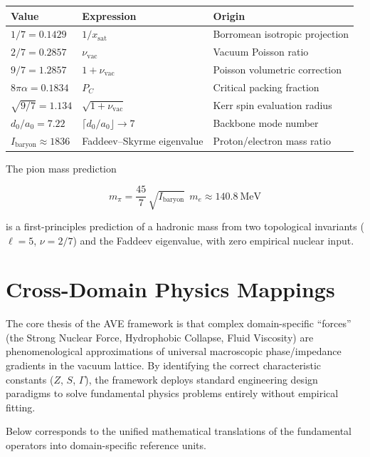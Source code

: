 \begin{center}
\renewcommand{\arraystretch}{1.3}
\begin{tabular}{l l l}
\toprule
\textbf{Value} & \textbf{Expression} & \textbf{Origin} \\
\midrule
$1/7 = 0.1429$ & $1/x_\mathrm{sat}$ & Borromean isotropic projection \\
$2/7 = 0.2857$ & $\nu_\mathrm{vac}$ & Vacuum Poisson ratio \\
$9/7 = 1.2857$ & $1 + \nu_\mathrm{vac}$ & Poisson volumetric correction \\
$8\pi\alpha = 0.1834$ & $P_C$ & Critical packing fraction \\
$\sqrt{9/7} = 1.134$ & $\sqrt{1+\nu_\mathrm{vac}}$ & Kerr spin evaluation radius \\
$d_0/a_0 = 7.22$ & $\lceil d_0/a_0 \rfloor \to 7$ & Backbone mode number \\
$I_\mathrm{baryon} \approx 1836$ & Faddeev--Skyrme eigenvalue & Proton/electron mass ratio \\
\bottomrule
\end{tabular}
\end{center}

\noindent The pion mass prediction

\begin{equation}
    \boxed{m_\pi = \frac{45}{7}\,\sqrt{I_\mathrm{baryon}}\;\,m_e \approx 140.8~\mathrm{MeV}}
\end{equation}

\noindent is a first-principles prediction of a hadronic mass from two topological invariants ($\ell = 5$, $\nu = 2/7$) and the Faddeev eigenvalue, with zero empirical nuclear input.

\section{Cross-Domain Physics Mappings}
\label{sec:cross_domain_mappings}

The core thesis of the AVE framework is that complex domain-specific ``forces'' (the Strong Nuclear Force, Hydrophobic Collapse, Fluid Viscosity) are phenomenological approximations of universal macroscopic phase/impedance gradients in the vacuum lattice. By identifying the correct characteristic constants ($Z$, $S$, $\Gamma$), the framework deploys standard engineering design paradigms to solve fundamental physics problems entirely without empirical fitting.

Below corresponds to the unified mathematical translations of the fundamental operators into domain-specific reference units.

